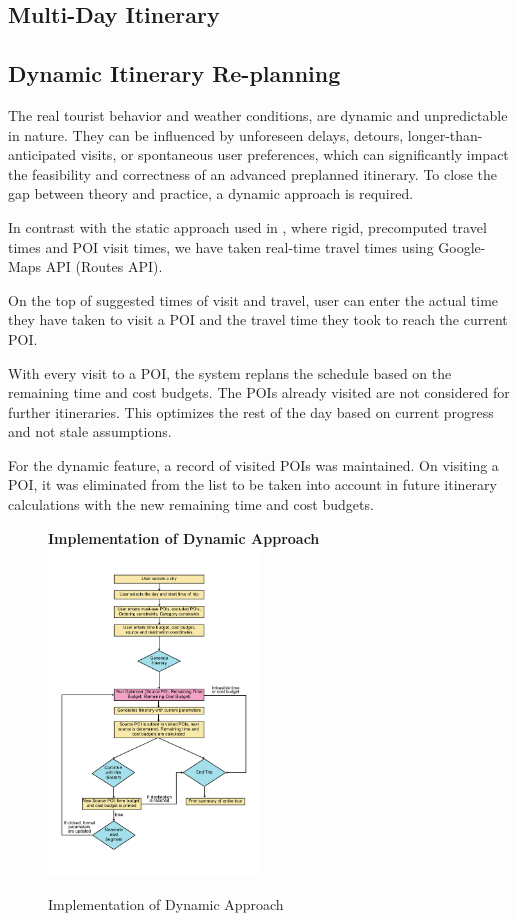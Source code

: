 \subsection{Multi-Day Itinerary}

\subsection{Dynamic Itinerary Re-planning}

The real tourist behavior and weather conditions, are dynamic and unpredictable in nature. They can be influenced by unforeseen delays, detours, longer-than-anticipated visits, or spontaneous user preferences, which can significantly impact the feasibility and correctness of an advanced preplanned itinerary. To close the gap between theory and practice, a dynamic approach is required.

In contrast with the static approach used in \cite{taylor2018tour}, where rigid, precomputed travel times and POI visit times, we have taken real-time travel times using Google-Maps API (Routes API). 

On the top of suggested times of visit and travel, user can enter the actual time they have taken to visit a POI and the travel time they took to reach the current POI.

With every visit to a POI, the system replans the schedule based on the remaining time and cost budgets. The POIs already visited are not considered for further itineraries. This optimizes the rest of the day based on current progress and not stale assumptions.

For the dynamic feature, a record of visited POIs was maintained. On visiting a POI, it was eliminated from the list to be taken into account in future itinerary calculations with the new remaining time and cost budgets.

\begin{figure}[th]
\textbf{Implementation of Dynamic Approach}
\centering
\includegraphics[width=0.5\textwidth]{binary dynamic flowchart.png}
\caption{Implementation of Dynamic Approach}
\label{fig:flowchart_dynamic}
\end{figure}

